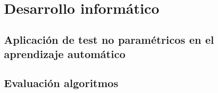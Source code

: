%
%


\chapter{Desarrollo informático}

\section*{Aplicación de test no paramétricos en el aprendizaje automático}

\section*{Evaluación algoritmos }
%
